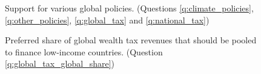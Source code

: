 \documentclass[12pt,english]{article}
\begin{document}
\begin{figure}[h!]
    \caption[Support for various global policies]{Support for various global policies. (Questions \ref{q:climate_policies}, \ref{q:other_policies}, \ref{q:global_tax} and \ref{q:national_tax})}\label{fig:support_likert}\label{fig:support}
\end{figure}



\begin{figure}[h!]
    \caption[Preferred share of global tax for low-income countries]{Preferred share of global wealth tax revenues that should be pooled to finance low-income countries. (Question \ref{q:global_tax_global_share})}\label{fig:global_tax_global_share}
\end{figure}
\end{document}
